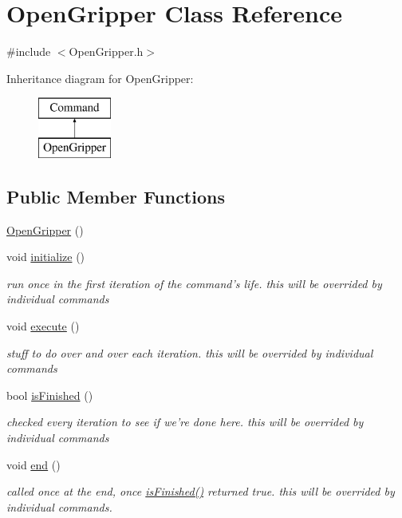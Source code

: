 \hypertarget{classOpenGripper}{\section{Open\-Gripper Class Reference}
\label{classOpenGripper}
}


{\ttfamily \#include $<$Open\-Gripper.\-h$>$}

Inheritance diagram for Open\-Gripper\-:\begin{figure}[H]
\begin{center}
\leavevmode
\includegraphics[height=2.000000cm]{classOpenGripper}
\end{center}
\end{figure}
\subsection*{Public Member Functions}
\begin{DoxyCompactItemize}
\item 
\hyperlink{classOpenGripper_af3ca0a56d41c4fbb98e2e5deba76a5a1}{Open\-Gripper} ()
\item 
void \hyperlink{classOpenGripper_a13dc36eb38dc51e85fefbccbef87a981}{initialize} ()
\begin{DoxyCompactList}\small\item\em run once in the first iteration of the command's life. this will be overrided by individual commands \end{DoxyCompactList}\item 
void \hyperlink{classOpenGripper_a358b40de6a9c051a2c7f322747c37dad}{execute} ()
\begin{DoxyCompactList}\small\item\em stuff to do over and over each iteration. this will be overrided by individual commands \end{DoxyCompactList}\item 
bool \hyperlink{classOpenGripper_a334eebec59e348ec33a78d238de85baa}{is\-Finished} ()
\begin{DoxyCompactList}\small\item\em checked every iteration to see if we're done here. this will be overrided by individual commands \end{DoxyCompactList}\item 
void \hyperlink{classOpenGripper_ad807b567e6ca9c8ef0a4f7a143506546}{end} ()
\begin{DoxyCompactList}\small\item\em called once at the end, once \hyperlink{classOpenGripper_a334eebec59e348ec33a78d238de85baa}{is\-Finished()} returned true. this will be overrided by individual commands. \end{DoxyCompactList}\end{DoxyCompactItemize}
